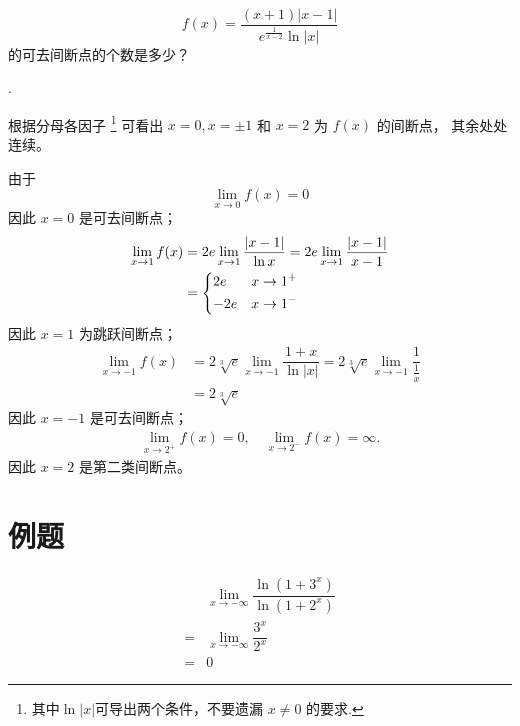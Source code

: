 \begin{example}
    \[
        f(x) = \dfrac{(x+1) | x-1 |}{e^{\frac{1}{x-2}} \ln |x|}
    \]
    的可去间断点的个数是多少？

    \cite[page 46, pdf 57, example 4]{we}.

    根据分母各因子
    \footnote{其中$\ln |x|$可导出两个条件，不要遗漏 $x \neq 0$ 的要求.}
    可看出 $x = 0, x = \pm 1$ 和 $x = 2$ 为 $f(x)$ 的间断点，
    其余处处连续。

    由于
    \[
        \lim_{x \to 0} f(x) = 0
    \]
    因此 $x = 0$ 是可去间断点；
    \begin{align*}
        \lim_{x \to 1} f(x) &= 2e \lim_{x\to 1} \dfrac{|x - 1|}{\ln x} = 2e \lim_{x\to 1} \dfrac{|x - 1|}{x - 1} \\
                            &= 
                            \begin{dcases}
                                2e & x \to 1^+ \\
                                -2e & x \to 1^-
                            \end{dcases}
    \end{align*}
    因此 $x = 1$ 为跳跃间断点；
    \begin{align*}
        \lim_{x \to -1} f(x) &= 2 \sqrt[3]{e} \lim_{x \to -1} \dfrac{1 + x}{\ln |x|} = 2 \sqrt[3]{e} \lim_{x \to -1} \dfrac{1}{\frac{1}{x}} \\
                             &= 2 \sqrt[3]{e}
    \end{align*}
    因此 $x = -1$ 是可去间断点；
    \begin{align*}
        \lim_{x \to 2^+} f(x) = 0, \quad \lim_{x \to 2^-} f(x) = \infty.
    \end{align*}
    因此 $x = 2$ 是第二类间断点。
\end{example}

\section{例题}

\begin{example}
    \begin{align*}
         &\lim_{x \to - \infty} \dfrac{\ln (1+ 3^x)}{\ln (1+ 2^x)} \\
        =&\lim_{x \to - \infty} \dfrac{3^x}{2^x} \\
        =&0
    \end{align*}
\end{example}

